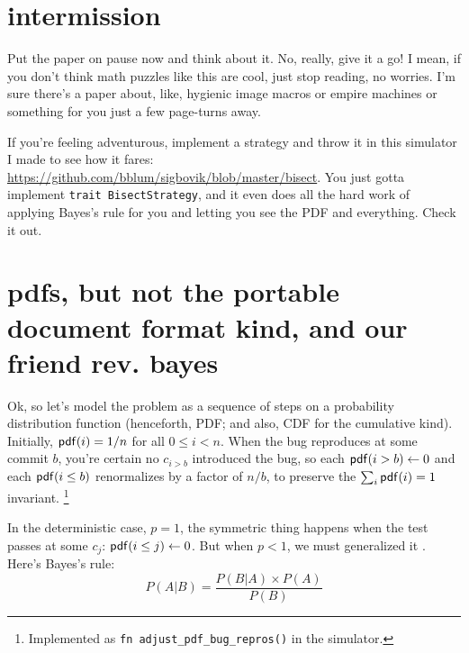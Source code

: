 \documentclass[11pt]{sigplanconf}
\begin{document}

\section{intermission}

Put the paper on pause now and think about it.
No, really, give it a go!
I mean, if you don't think math puzzles like this are cool, just stop reading, no worries.
I'm sure there's a paper about, like, hygienic image macros or empire machines or something for you just a few page-turns away.

If you're feeling adventurous,
implement a strategy and throw it in this simulator I made to see how it fares:
\url{https://github.com/bblum/sigbovik/blob/master/bisect}.
You just gotta implement {\tt trait BisectStrategy},
and it even does all the hard work of applying Bayes's rule
for you and letting you see the PDF and everything.
Check it out.



\section{pdfs, but not the portable document format kind, and our friend rev. bayes}
\label{sec:pdfs}

Ok, so let's model the problem as a sequence of steps on a probability distribution function
(henceforth, PDF; and also, CDF for the cumulative kind).
Initially, $\mathsf{pdf}(i) = 1/n$ for all $0 \le i < n$.
When the bug reproduces at some commit $b$,
you're certain no $c_{i>b}$ introduced the bug, so each $\mathsf{pdf}(i>b) \leftarrow 0$
and each $\mathsf{pdf}(i\le b)$ renormalizes by a factor of $n/b$, to preserve the
$\sum_i \mathsf{pdf}(i) = 1$
invariant.%
\footnote{Implemented as {\tt fn adjust\_pdf\_bug\_repros()} in the simulator.}

In the deterministic case, $p=1$,
the symmetric thing happens when the test passes at some $c_j$: $\mathsf{pdf}(i\le j) \leftarrow 0$.
But when $p<1$, we must generalized it \cite{mario3}. Here's Bayes's rule:
\[
P(A|B) = \frac{P(B|A) \times P(A)}{P(B)}
\]

\newcommand\renorm[1]{\ensuremath{\mathcal{R}_{#1}}\xspace}
\end{document}
